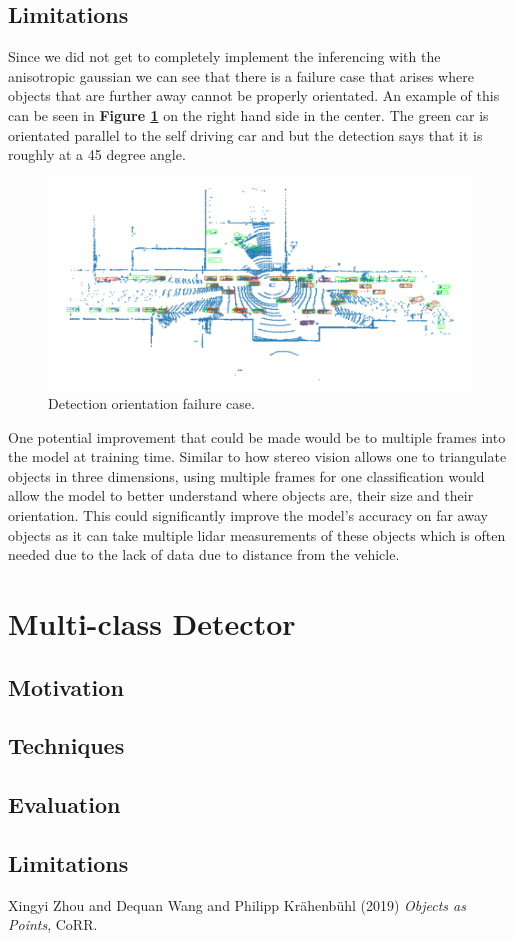 \documentclass[letter]{article}
\newcommand{\fref}[1]{\textbf{Figure \ref{#1}}}
\begin{document}
	\subsection{Limitations}
	Since we did not get to completely implement the inferencing with the anisotropic gaussian we can see that there is a failure case that arises where objects that are further away cannot be properly orientated. An example of this can be seen in \fref{fig:failure} on the right hand side in the center. The green car is orientated parallel to the self driving car and but the detection says that it is roughly at a 45 degree angle.

	\begin{figure}[h]
		\centering
		\includegraphics[scale=0.35]{images/failure.png}
		\caption{Detection orientation failure case.}
		\label{fig:failure}
	\end{figure}
	
	One potential improvement that could be made would be to multiple frames into the model at training time. Similar to how stereo vision allows one to triangulate objects in three dimensions, using multiple frames for one classification would allow the model to better understand where objects are, their size and their orientation. This could significantly improve the model's accuracy on far away objects as it can take multiple lidar measurements of these objects which is often needed due to the lack of data due to distance from the vehicle.

	\section{Multi-class Detector}

	\subsection{Motivation}

	\subsection{Techniques}

	\subsection{Evaluation}

	\subsection{Limitations}

	\begin{thebibliography}{9}
		Xingyi Zhou and Dequan Wang and Philipp Kr{\"{a}}henb{\"{u}}hl (2019) \emph{Objects as Points}, CoRR.
	\end{thebibliography}
\end{document}
